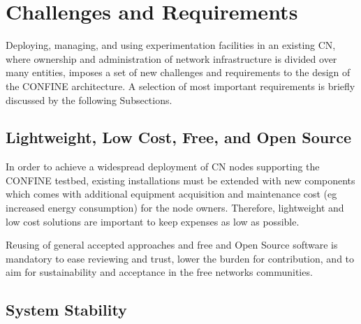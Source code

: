 \documentclass[conference]{IEEEtran}
\begin{document}
\section{Challenges and Requirements}



Deploying, managing, and using experimentation facilities in an
existing CN, where ownership and administration of network
infrastructure is divided over many entities, imposes a set of new
challenges and requirements to the design of the CONFINE
architecture. A selection of most important requirements is briefly
discussed by the following Subsections.


\subsection{Lightweight, Low Cost, Free, and Open Source}

In order to achieve a widespread deployment of CN nodes supporting the
CONFINE testbed, existing installations must be extended with new
components which comes with additional equipment acquisition and
maintenance cost (eg increased energy consumption) for the node
owners. Therefore, lightweight and low cost solutions are important to
keep expenses as low as possible.

Reusing of general accepted approaches and free and Open Source
software is mandatory to ease reviewing and trust, lower the burden
for contribution, and to aim for sustainability and acceptance in the
free networks communities.

\subsection{System Stability}
\end{document}
